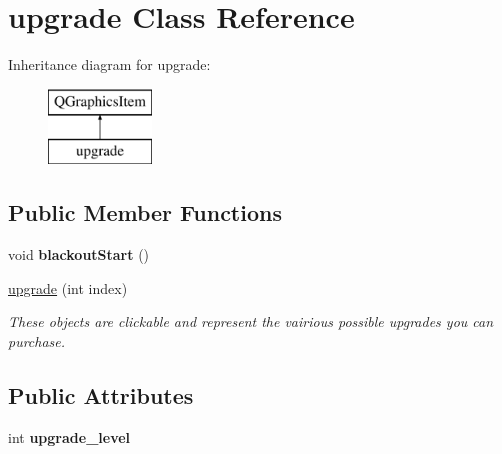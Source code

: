 \hypertarget{classupgrade}{\section{upgrade Class Reference}
\label{classupgrade}
}
Inheritance diagram for upgrade\-:\begin{figure}[H]
\begin{center}
\leavevmode
\includegraphics[height=2.000000cm]{classupgrade}
\end{center}
\end{figure}
\subsection*{Public Member Functions}
\begin{DoxyCompactItemize}
\item 
\hypertarget{classupgrade_af4629a61539fd8bfa371b625a85041c8}{void {\bfseries blackout\-Start} ()}\label{classupgrade_af4629a61539fd8bfa371b625a85041c8}

\item 
\hyperlink{classupgrade_adb0c00eec47ddfd36b00713659e09141}{upgrade} (int index)
\begin{DoxyCompactList}\small\item\em These objects are clickable and represent the vairious possible upgrades you can purchase. \end{DoxyCompactList}\end{DoxyCompactItemize}
\subsection*{Public Attributes}
\begin{DoxyCompactItemize}
\item 
\hypertarget{classupgrade_a8a08f313ef51624c733fabff824ae2b6}{int {\bfseries upgrade\-\_\-level}}\label{classupgrade_a8a08f313ef51624c733fabff824ae2b6}

\end{DoxyCompactItemize}

